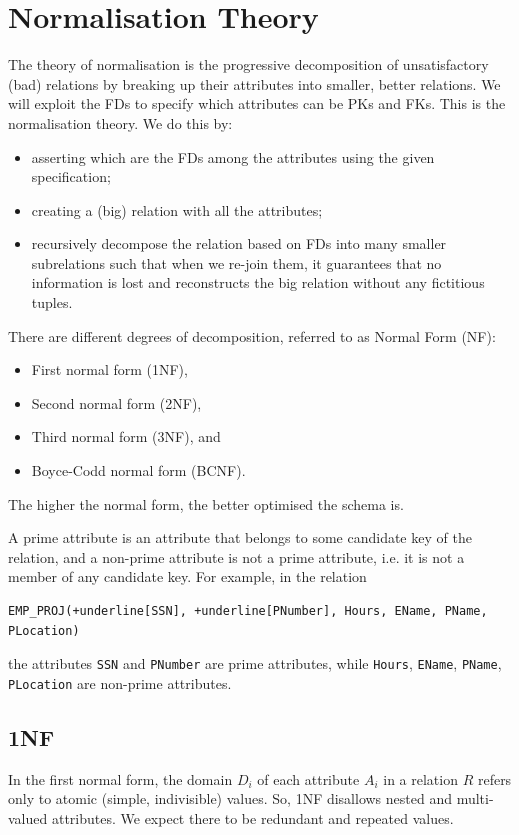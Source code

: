 \documentclass[a4paper, openany]{memoir}
\begin{document}
\newpage

\section{Normalisation Theory}
The theory of normalisation is the progressive decomposition of unsatisfactory (bad) relations by breaking up their attributes into smaller, better relations. We will exploit the FDs to specify which attributes can be PKs and FKs. This is the normalisation theory. We do this by:
\begin{itemize}
    \item asserting which are the FDs among the attributes using the given specification;
    \item creating a (big) relation with all the attributes;
    \item recursively decompose the relation based on FDs into many smaller subrelations such that when we re-join them, it guarantees that no information is lost and reconstructs the big relation without any fictitious tuples.
\end{itemize}

There are different degrees of decomposition, referred to as Normal Form (NF):
\begin{itemize}
    \item First normal form (1NF),
    \item Second normal form (2NF),
    \item Third normal form (3NF), and
    \item Boyce-Codd normal form (BCNF).
\end{itemize}
The higher the normal form, the better optimised the schema is.

A prime attribute is an attribute that belongs to some candidate key of the relation, and a non-prime attribute is not a prime attribute, i.e. it is not a member of any candidate key. For example, in the relation
\begin{Verbatim}[commandchars=+\[\]]
EMP_PROJ(+underline[SSN], +underline[PNumber], Hours, EName, PName, PLocation)
\end{Verbatim}
the attributes \texttt{SSN} and \texttt{PNumber} are prime attributes, while \texttt{Hours}, \texttt{EName}, \texttt{PName}, \texttt{PLocation} are non-prime attributes.

\subsection{1NF}
In the first normal form, the domain $D_i$ of each attribute $A_i$ in a relation $R$ refers only to atomic (simple, indivisible) values. So, 1NF disallows nested and multi-valued attributes. We expect there to be redundant and repeated values.
\end{document}
